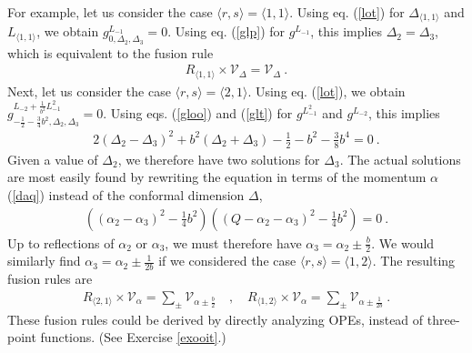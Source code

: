 \documentclass[12pt,a4paper,notitlepage]{report}
\numberwithin{equation}{section}
\theoremstyle{break}
\begin{document}
For example, let us consider the case $\langle r,s \rangle = \langle 1,1 \rangle$. Using eq. (\ref{lot}) for $\Delta_{\langle 1,1 \rangle}$ and $L_{\langle 1,1 \rangle}$, we obtain
$g^{L_{-1}}_{0,\Delta_2,\Delta_3} = 0$. Using eq. (\ref{glp}) for $g^{L_{-1}}$, this implies 
$
 \Delta_2=\Delta_3
$,
which is equivalent to the fusion rule
\begin{align}
 \boxed{R_{\langle 1,1\rangle} \times \mathcal{V}_\Delta = \mathcal{V}_\Delta} \ .
\end{align}
Next, let us consider the case $\langle r,s \rangle = \langle 2,1 \rangle$. Using eq. (\ref{lot}), we obtain 
$g^{L_{-2} +\frac{1}{b^2} L_{-1}^2 }_{-\frac12 -\frac34 b^2,\Delta_2,\Delta_3} = 0$. Using eqs. (\ref{gloo}) and (\ref{glt}) for $g^{L_{-1}^2}$ and $g^{L_{-2}}$, this implies
\begin{align}
 2(\Delta_2-\Delta_3)^2 + b^2 (\Delta_2+\Delta_3) - \frac12 - b^2 -\frac38 b^4= 0\ .
\end{align}
Given a value of $\Delta_2$, we therefore have two solutions for $\Delta_3$. The actual solutions are most easily found by rewriting the equation in terms of the momentum $\alpha$ (\ref{daq}) instead of the conformal dimension $\Delta$,
\begin{align}
 \left((\alpha_2-\alpha_3)^2 -\frac14 b^2\right)\left((Q-\alpha_2-\alpha_3)^2 -\frac14 b^2\right) = 0\ .
\end{align}
Up to reflections of $\alpha_2$ or $\alpha_3$, we must therefore have
$
 \alpha_3 = \alpha_2 \pm \frac{b}{2}
$.
We would similarly find $\alpha_3 = \alpha_2 \pm \frac{1}{2b}$ if we considered the case $\langle r,s\rangle = \langle 1,2\rangle$. 
The resulting fusion rules are 
\begin{align}
\boxed{ R_{\langle 2,1 \rangle}\times \mathcal{V}_\alpha = \sum_\pm \mathcal{V}_{\alpha \pm \frac{b}{2}} }\quad , \quad 
\boxed{ R_{\langle 1,2 \rangle}\times \mathcal{V}_\alpha = \sum_\pm \mathcal{V}_{\alpha \pm \frac{1}{2b}} }\ .
\label{rot}
\end{align}
These fusion rules could be derived by directly analyzing OPEs, instead of three-point functions. (See Exercise \ref{exooit}.) 
\end{document}
